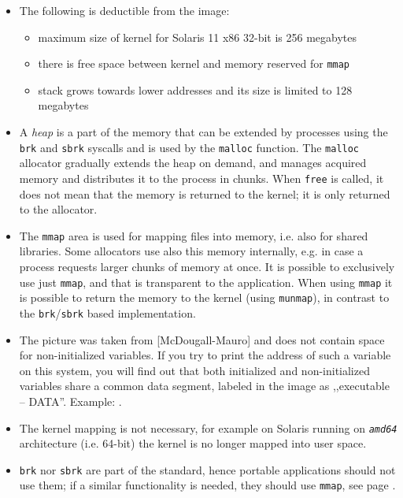 \begin{itemize}
\item The following is deductible from the image:

\begin{itemize}
\item maximum size of kernel for Solaris 11 x86 32-bit is 256 megabytes
\item there is free space between kernel and memory reserved for \texttt{mmap}
\item stack grows towards lower addresses and its size is limited to 128 megabytes
\end{itemize}

\item A \emph{heap} is a part of the memory that can be extended by processes
using the \texttt{brk} and \texttt{sbrk} syscalls and is used by the
\texttt{malloc} function.  The \texttt{malloc} allocator gradually extends the
heap on demand, and manages acquired memory and distributes it to the process in
chunks.  When \texttt{free} is called, it does not mean that the memory is
returned to the kernel; it is only returned to the allocator.
\item The \texttt{mmap} area is used for mapping files into memory, i.e. also
for shared libraries. Some allocators use also this memory internally,
e.g. in case a process requests larger chunks of memory at once.  It is possible
to exclusively use just \texttt{mmap}, and that is transparent to the
application. When using \texttt{mmap} it is possible to return the memory to the
kernel (using \texttt{munmap}), in contrast to the \texttt{brk}/\texttt{sbrk}
based implementation.
\item The picture was taken from [McDougall-Mauro] and does not contain space
for non-initialized variables. If you try to print the address of such a
variable on this system, you will find out that both initialized and
non-initialized variables share a common data segment, labeled in the image as
,,executable -- DATA''.  Example: .
\item The kernel mapping is not necessary, for example on Solaris running on
\emph{\texttt{amd64}} architecture (i.e. 64-bit) the kernel is no longer mapped
into user space.
\item \texttt{brk} nor \texttt{sbrk} are part of the standard, hence portable
applications should not use them; if a similar functionality is needed, they
should use \texttt{mmap}, see page \pageref{MMAP}.
\end{itemize}

